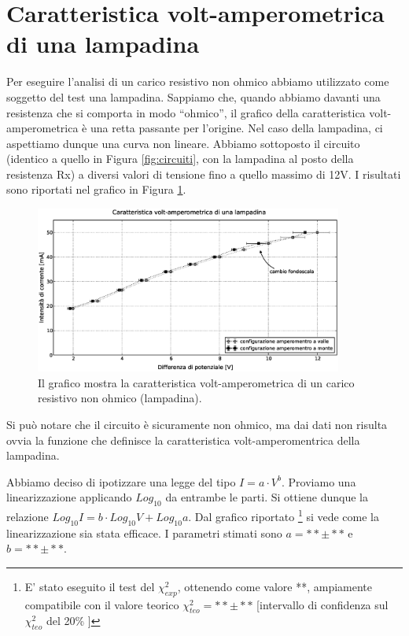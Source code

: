 \section{Caratteristica volt-amperometrica di una lampadina}
Per eseguire l'analisi di un carico resistivo non ohmico abbiamo utilizzato come soggetto del test una lampadina. Sappiamo che, quando abbiamo davanti una resistenza che si comporta in modo ``ohmico'', il grafico della caratteristica volt-amperometrica è una retta passante per l'origine. Nel caso della lampadina, ci aspettiamo dunque una curva non lineare. Abbiamo sottoposto il circuito (identico a quello in Figura \ref{fig:circuiti}, con la lampadina al posto della resistenza Rx) a diversi valori di tensione fino a quello massimo di 12V. I risultati sono riportati nel grafico in Figura \ref{fig:lampadina}.

\begin{figure}[h]
    \centering
        \includegraphics[width=0.9\textwidth]{lamp.eps}
        \caption{Il grafico mostra la caratteristica volt-amperometrica di un carico resistivo non ohmico (lampadina).}
        \label{fig:lampadina}
\end{figure}

Si può notare che il circuito è sicuramente non ohmico, ma dai dati non risulta ovvia la funzione che definisce la caratteristica volt-amperomentrica della lampadina.

Abbiamo deciso di ipotizzare una legge del tipo $I=a \cdot V^{b}$. Proviamo una linearizzazione applicando $Log_{10}$ da entrambe le parti. Si ottiene dunque la relazione $Log_{10}I=b \cdot Log_{10}V + Log_{10}a$. Dal grafico riportato \footnote{E' stato eseguito il test del $\chi ^2_{exp}$, ottenendo come valore **, ampiamente compatibile con il valore teorico $\chi ^2_{teo}=** \pm **$ [intervallo di confidenza sul $\chi ^2_{teo}$ del 20\% ] } si vede come la linearizzazione sia stata efficace. I parametri stimati sono $a=** \pm **$ e $b=** \pm **$.

